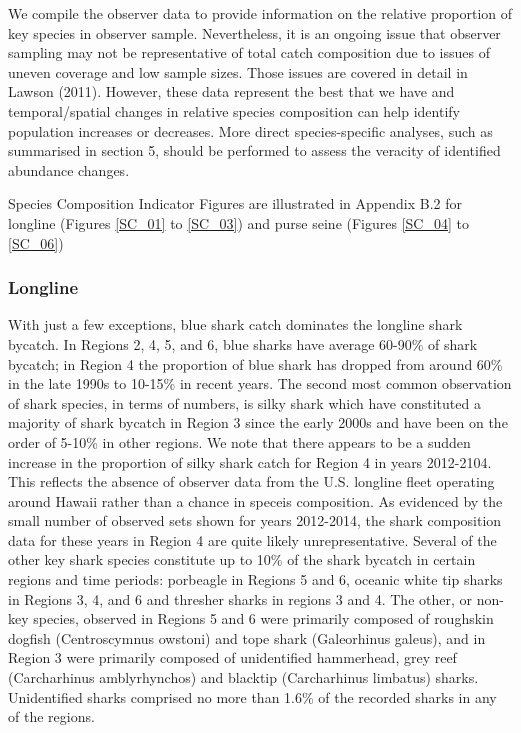 \documentclass[12pt]{SCreport}
\begin{document}
We compile the observer data to provide information on the relative proportion of key species in observer sample. Nevertheless, it is an ongoing issue that observer sampling may not be representative of total catch composition due to issues of uneven coverage and low sample sizes. Those issues are covered in detail in Lawson (2011). However, these data represent the best that we have and temporal/spatial changes in relative species composition can help identify population increases or decreases. More direct species-specific analyses, such as summarised in section 5, should be performed to assess the veracity of identified abundance changes.

Species Composition Indicator Figures are illustrated in Appendix B.2 for longline (Figures \ref{SC_01} to \ref{SC_03}) and purse seine (Figures \ref{SC_04} to \ref{SC_06})

      
  \subsubsection{Longline}  
  

With just a few exceptions, blue shark catch dominates the longline shark bycatch.  In Regions 2, 4, 5, and 6, blue sharks have average 60-90\% of shark bycatch; in Region 4 the proportion of blue shark has dropped from around 60\% in the late 1990s to 10-15\% in recent years.  The second most common observation of shark species, in terms of numbers, is silky shark which have constituted a majority of shark bycatch in Region 3 since the early 2000s and have been on the order of 5-10\% in other regions.  We note that there appears to be a sudden increase in the proportion of silky shark catch for Region 4 in years 2012-2104.  This reflects the absence of observer data from the U.S. longline fleet operating around Hawaii rather than a chance in speceis composition.  As evidenced by the small number of observed sets shown for years 2012-2014, the shark composition data for these years in Region 4 are quite likely unrepresentative.  Several of the other key shark species constitute up to 10\% of the shark bycatch in certain regions and time periods: porbeagle in Regions 5 and 6, oceanic white tip sharks in Regions 3, 4, and 6 and thresher sharks in regions 3 and 4.  The other, or non-key species, observed in Regions 5 and 6 were primarily composed of roughskin dogfish (Centroscymnus owstoni) and tope shark (Galeorhinus galeus), and in Region 3 were primarily composed of unidentified hammerhead, grey reef (Carcharhinus amblyrhynchos) and blacktip (Carcharhinus limbatus) sharks. Unidentified sharks comprised no more than 1.6\% of the recorded sharks in any of the regions.
\end{document}
